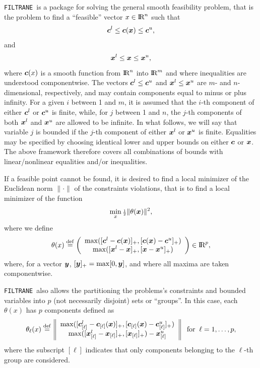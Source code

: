 \documentclass{galahad}
\newcommand{\packagename}{FILTRANE}
\newcommand{\filtrane}{{\tt \packagename}}
\renewcommand{\Re}{\hbox{I\hskip -1.5pt R}}
\begin{document}
\galheader


\galsummary

\filtrane\ is a package for solving the general smooth feasibility
problem, that is the problem to find a ``feasible'' vector $x \in \Re^n$ such
that 
\[
{\bm{c}}^l \leq {\bm{c}}({\bm{x}}) \leq {\bm{c}}^u,
\]
and
\[
{\bm{x}}^l \leq {\bm{x}} \leq {\bm{x}}^u,
\]
where ${\bm{c}}(x)$ is a smooth function from $\Re^n$ into
$\Re^m$ and where inequalities are understood componentwise.
The vectors ${\bm{c}}^l \leq {\bm{c}}^u$ and ${\bm{x}}^l \leq {\bm{x}}^u$ are $m$- and
$n$-dimensional, respectively, and may contain components equal to minus or
plus infinity. For a given $i$ between 1 and $m$, it is assumed that the
$i$-th component of either ${\bm{c}}^l$ or ${\bm{c}}^u$ is finite, while, for $j$
between 1 and $n$, the $j$-th components of both ${\bm{x}}^l$ and ${\bm{x}}^u$ are
allowed to be infinite.  In what follows, we will say that variable $j$ is
bounded if the $j$-th component of either ${\bm{x}}^l$ or ${\bm{x}}^u$ is
finite. Equalities may be specified by choosing identical lower and upper
bounds on either ${\bm{c}}$ or ${\bm{x}}$. The above framework therefore covers all
combinations of bounds with linear/nonlinear equalities and/or inequalities.

If a feasible point cannot be found, it is desired to find a local minimizer
of the Euclidean norm $\|\cdot\|$ of the constraints violations, that is to
find a local minimizer of the function
\begin{equation}\label{thetadef}
\min_x {\scriptstyle \frac{1}{2}} \| \theta({\bm{x}}) \|^2,
\end{equation}
where we define
\[
\theta(x) \eqdef \left( \begin{array}{c}
                 \max( [\bmc^l - \bmc(\bmx)]_+, [ \bmc( \bmx ) - \bmc^u ]_+ ) \\
                 \max( [\bmx^l - \bmx]_+, [ \bmx - \bmx^u ]_+ )
                 \end{array} \right) \in \Re^p,
\]
where, for a vector ${\bm{y}}$, $[{\bm{y}}]_+ = \max[0,{\bm{y}}]$, and where all maxima
are taken componentwise.

\filtrane\ also allows the partitioning the problems's constraints and bounded
variables into $p$ (not necessarily disjoint) sets or ``groups''.
In this case, each $\theta(x)$ has $p$ components defined as
\[
\theta_{\ell}(x) \stackrel{\rm def}{=} 
\left\| \begin{array}{c}
    \max( [ {\bm{c}}^l_{[\ell]} - {\bm{c}}_{[\ell]}( {\bm{x}} )]_+,
          [ {\bm{c}}_{[\ell]}( {\bm{x}} ) - {\bm{c}}^u_{[\ell]} ]_+ ) \\
    \max( [ {\bm{x}}^l_{[\ell]} - {\bm{x}}_{[\ell]}]_+,
          [ {\bm{x}}_{[\ell]} ]_+ ) - {\bm{x}}^u_{[\ell]} \\
        \end{array} \right\|
\;\; \mbox{for} \;\; \ell = 1, \ldots, p, 
\]
where the subscript $[\ell]$ indicates that only components belonging to
the $\ell$-th group are considered.
\end{document}
